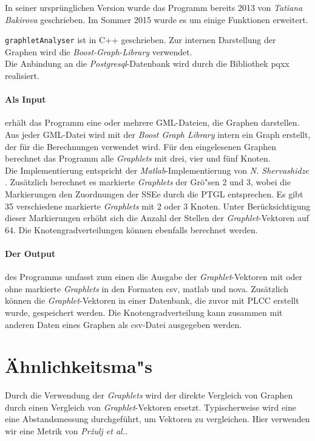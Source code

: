 \documentclass{report}
\begin{document}
In seiner urspr\"unglichen Version wurde das Programm bereits 2013 von \textit{Tatiana Bakirova} geschrieben. Im Sommer 2015 wurde es um einige Funktionen erweitert.

\texttt{graphletAnalyser} ist in C++ geschrieben. Zur internen Darstellung der Graphen wird die \textit{Boost-Graph-Library} verwendet.\\
Die Anbindung an die \textit{Postgresql}-Datenbank wird durch die Bibliothek pqxx realisiert.

\paragraph{Als Input} erh\"alt das Programm eine oder mehrere GML-Dateien, die Graphen darstellen. Aus jeder GML-Datei wird mit der \textit{Boost Graph Library} intern ein Graph erstellt, der f\"ur die Berechnungen verwendet wird. F\"ur den eingelesenen Graphen berechnet das Programm alle \textit{Graphlets} mit drei, vier und f\"unf Knoten.\\
Die Implementierung entspricht der \textit{Matlab}-Implementierung von \textit{N. Shervashidze} \cite{sherv_graphlets}. Zus\"atzlich berechnet es markierte \textit{Graphlets} der Gr\"o"sen 2 und 3, wobei die Markierungen den Zuordnungen der SSEe durch die PTGL entsprechen. Es gibt 35 verschiedene markierte \textit{Graphlets} mit 2 oder 3 Knoten. Unter Ber\"ucksichtigung dieser Markierungen erh\"oht sich die Anzahl der Stellen der \textit{Graphlet}-Vektoren auf 64.
Die Knotengradverteilungen k\"onnen ebenfalls berechnet werden.

\paragraph{Der Output} des Programms umfasst zum einen die Ausgabe der \textit{Graphlet}-Vektoren mit oder ohne markierte \textit{Graphlets} in den Formaten csv, matlab und nova. Zus\"atzlich k\"onnen die \textit{Graphlet}-Vektoren in einer Datenbank, die zuvor mit PLCC erstellt wurde, gespeichert werden. Die Knotengradverteilung kann zusammen mit anderen Daten eines Graphen als csv-Datei ausgegeben werden.


\section{\"Ahnlichkeitsma"s}

Durch die Verwendung der \textit{Graphlets} wird der direkte Vergleich von Graphen durch einen Vergleich von \textit{Graphlet}-Vektoren ersetzt. Typischerweise wird eine eine Abstandsmessung durchgef\"uhrt, um Vektoren zu vergleichen. Hier verwenden wir eine Metrik von \textit{Pr\v{z}ulj et al.}.
\end{document}
